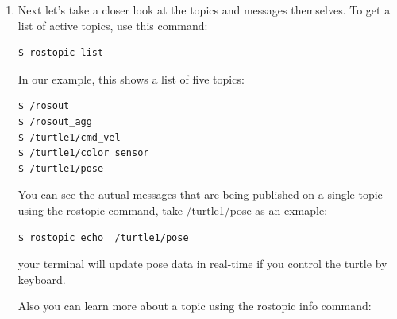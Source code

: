 \begin{enumerate}
	In this case, you will see something like . In this graph, the ovals represent nodes, and the directed edges represent publisher-subscriber relationships.
	The graph tells us that the node named /teleop\_{}turtle publishes messages on a topic called /turtle1/cmd\_{}vel, and that the node named /turtlesim subscribes to those messages. \\
	Now we can understand at least part of how the turtlesim teleoperation system works. When you press a key, the /teleop\_{}turtle node publishes messages with those movement commands on a topic called /turtle1/cmd\_{}vel. 
	Because it subscribes to that topic, the turtlesim\_{}node receives those messages, and simulates the turtle moving with the requested velocity. The important points here are:

	- The simulator doesn't care (or even know) which program publishes those cmd\_{}vel messages. Any program that publishes on that topic can control the turtle.

	- The teleoperation program doesn't care (or even know) which program subscribes to the cmd\_{}vel messages it publishes. Any program that subscribes to that topic is free to respond to those commands.
	
	\item Next let's take a closer look at the topics and messages themselves. To get a list of active topics, use this command:

\begin{lstlisting}[language=bash]
$ rostopic list
\end{lstlisting}

	In our example, this shows a list of five topics:

\begin{lstlisting}[language=bash]
$ /rosout
$ /rosout_agg
$ /turtle1/cmd_vel
$ /turtle1/color_sensor
$ /turtle1/pose
\end{lstlisting}

	You can see the autual messages that are being published on a single topic using the rostopic command, take /turtle1/pose as an exmaple:

\begin{lstlisting}[language=bash]
$ rostopic echo  /turtle1/pose
\end{lstlisting}

	your terminal will update pose data in real-time if you control the turtle by keyboard.

	Also you can learn more about a topic using the rostopic info command:


\end{enumerate}
